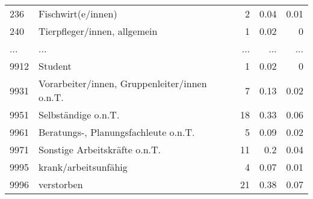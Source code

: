 \begin{longtable}{lXrrr}
        236 & \multicolumn{1}{X}{Fischwirt(e/innen)} & %
          \num{2} &
          \num[round-mode=places,round-precision=2]{0.04} &
          \num[round-mode=places,round-precision=2]{0.01} \\
        240 & \multicolumn{1}{X}{Tierpfleger/innen, allgemein} & %
          \num{1} &
          \num[round-mode=places,round-precision=2]{0.02} &
          \num[round-mode=places,round-precision=2]{0} \\
       ... & ... & ... & ... & ... \\
        9912 & \multicolumn{1}{X}{Student} & %
          \num{1} &
          \num[round-mode=places,round-precision=2]{0.02} &
          \num[round-mode=places,round-precision=2]{0} \\

        9931 & \multicolumn{1}{X}{Vorarbeiter/innen, Gruppenleiter/innen o.n.T.} & %
          \num{7} &
          \num[round-mode=places,round-precision=2]{0.13} &
          \num[round-mode=places,round-precision=2]{0.02} \\

        9951 & \multicolumn{1}{X}{Selbständige o.n.T.} & %
          \num{18} &
          \num[round-mode=places,round-precision=2]{0.33} &
          \num[round-mode=places,round-precision=2]{0.06} \\

        9961 & \multicolumn{1}{X}{Beratungs-, Planungsfachleute o.n.T.} & %
          \num{5} &
          \num[round-mode=places,round-precision=2]{0.09} &
          \num[round-mode=places,round-precision=2]{0.02} \\

        9971 & \multicolumn{1}{X}{Sonstige Arbeitskräfte o.n.T.} & %
          \num{11} &
          \num[round-mode=places,round-precision=2]{0.2} &
          \num[round-mode=places,round-precision=2]{0.04} \\

        9995 & \multicolumn{1}{X}{krank/arbeitsunfähig} & %
          \num{4} &
          \num[round-mode=places,round-precision=2]{0.07} &
          \num[round-mode=places,round-precision=2]{0.01} \\

        9996 & \multicolumn{1}{X}{verstorben} & %
          \num{21} &
          \num[round-mode=places,round-precision=2]{0.38} &
          \num[round-mode=places,round-precision=2]{0.07} \\


\end{longtable}
